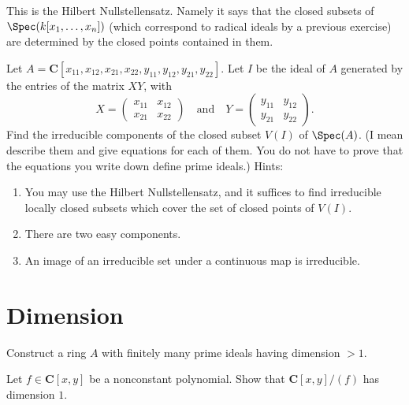 \begin{remark}
\label{remark-Hilbert-Nullstellensatz}
This is the Hilbert Nullstellensatz. Namely it says
that the closed subsets of $\Spec(k[x_1, \ldots, x_n])$
(which correspond to radical ideals by a previous exercise)
are determined by the closed points contained in them.
\end{remark}

\begin{exercise}
\label{exercise-product-matrices-ring}
Let $A =
{\mathbf C}[x_{11}, x_{12}, x_{21}, x_{22}, y_{11}, y_{12}, y_{21}, y_{22}]$.
Let $I$ be the ideal of $A$ generated by the entries of the
matrix $XY$, with
$$
X = \left(
\begin{matrix}
x_{11} & x_{12}\\
x_{21} & x_{22}
\end{matrix}
\right)
\quad\text{and}\quad
Y = \left(
\begin{matrix}
y_{11} & y_{12}\\
y_{21} & y_{22}
\end{matrix}
\right).
$$
Find the irreducible components of the closed subset $V(I)$ of
$\Spec(A)$.
(I mean describe them and give equations for each of them. You do not have
to prove that the equations you write down define prime ideals.) Hints:
\begin{enumerate}
\item You may use the Hilbert Nullstellensatz, and it suffices to find
irreducible locally closed subsets which cover the set of closed points of
$V(I)$.
\item There are two easy components.
\item An image of an irreducible set under a continuous map is
irreducible.
\end{enumerate}
\end{exercise}




\section{Dimension}
\label{section-dimension}

\begin{exercise}
\label{exercise-dimension-bigger-one-finite-nr-primes}
Construct a ring $A$ with finitely many prime ideals having dimension $> 1$.
\end{exercise}

\begin{exercise}
\label{exercise-hypersurface-in-A2-dimension-one}
Let $f \in \mathbf{C}[x, y]$ be a nonconstant polynomial.
Show that $\mathbf{C}[x, y]/(f)$ has dimension $1$.
\end{exercise}

